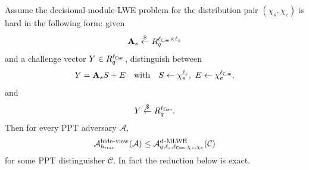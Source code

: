 \begin{theorem}\label{thm:tran-lwe-hiding}
Assume the decisional module-LWE problem for the distribution pair \((\chi_s,\chi_e)\) is hard in the
following form: given
\[
\mathbf{A}_s\overset{\$}{\leftarrow} R_q^{\ell_{\mathsf{Com}}\times \ell_s}
\]
and a challenge vector \(Y\in R_q^{\ell_{\mathsf{Com}}}\), distinguish between
\begin{equation}\label{eq:tran-lwe-real}
Y = \mathbf{A}_s S + E
\quad\text{with}\quad
S\gets \chi_s^{\ell_s},\ E\gets \chi_e^{\ell_{\mathsf{Com}}},
\end{equation}
and
\begin{equation}\label{eq:tran-lwe-rand}
Y \overset{\$}{\leftarrow} R_q^{\ell_{\mathsf{Com}}}.
\end{equation}
Then for every PPT adversary \(\mathcal A\),
\begin{equation}\label{eq:tran-lwe-adv}
\mathcal{A}^{\mathrm{hide\mbox{-}view}}_{h_{\mathrm{tran}}}(\mathcal A)
\le
\mathcal{A}^{\mathrm{d\mbox{-}MLWE}}_{q,\ell_s,\ell_{\mathsf{Com}},\chi_s,\chi_e}(\mathcal C)
\end{equation}
for some PPT distinguisher \(\mathcal C\). In fact the reduction below is exact.
\end{theorem}

